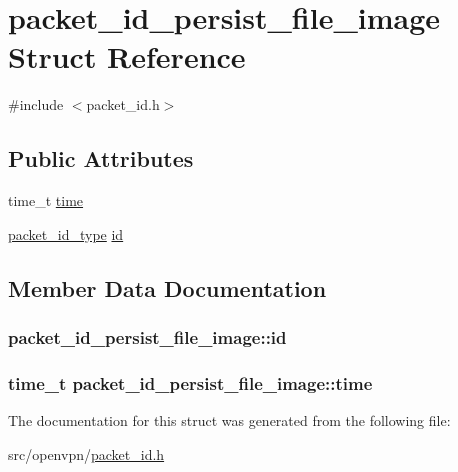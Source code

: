 \hypertarget{structpacket__id__persist__file__image}{}\section{packet\+\_\+id\+\_\+persist\+\_\+file\+\_\+image Struct Reference}
\label{structpacket__id__persist__file__image}


{\ttfamily \#include $<$packet\+\_\+id.\+h$>$}

\subsection*{Public Attributes}
\begin{DoxyCompactItemize}
\item 
time\+\_\+t \hyperlink{structpacket__id__persist__file__image_a325bcf239ab9966fdc7372008dabfb27}{time}
\item 
\hyperlink{packet__id_8h_a345f753b1c6ea20d24409e769aadb7e6}{packet\+\_\+id\+\_\+type} \hyperlink{structpacket__id__persist__file__image_abf5d0ef260ed7a531bc4a244ed3a6f95}{id}
\end{DoxyCompactItemize}


\subsection{Member Data Documentation}
\hypertarget{structpacket__id__persist__file__image_abf5d0ef260ed7a531bc4a244ed3a6f95}{}
\subsubsection[{id}]{ packet\+\_\+id\+\_\+persist\+\_\+file\+\_\+image\+::id}\label{structpacket__id__persist__file__image_abf5d0ef260ed7a531bc4a244ed3a6f95}
\hypertarget{structpacket__id__persist__file__image_a325bcf239ab9966fdc7372008dabfb27}{}
\subsubsection[{time}]{\setlength{\rightskip}{0pt plus 5cm}time\+\_\+t packet\+\_\+id\+\_\+persist\+\_\+file\+\_\+image\+::time}\label{structpacket__id__persist__file__image_a325bcf239ab9966fdc7372008dabfb27}


The documentation for this struct was generated from the following file\+:\begin{DoxyCompactItemize}
\item 
src/openvpn/\hyperlink{packet__id_8h}{packet\+\_\+id.\+h}\end{DoxyCompactItemize}

